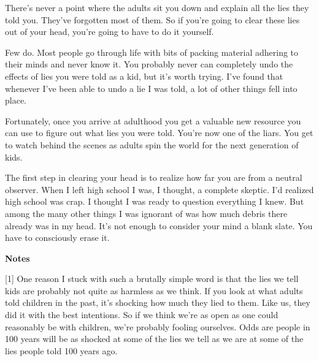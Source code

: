 There's never a point where the
                  adults sit you down and explain all the lies they told you.
                  They've forgotten most of them. So if you're going to clear
                  these lies out of your head, you're going to have to do it
                  yourself.

Few do. Most people go through life with
                  bits of packing material adhering to their minds and never
                  know it. You probably never can completely undo the effects of
                  lies you were told as a kid, but it's worth trying. I've found
                  that whenever I've been able to undo a lie I was told, a lot
                  of other things fell into place.

Fortunately, once
                  you arrive at adulthood you get a valuable new resource you
                  can use to figure out what lies you were told. You're now one
                  of the liars. You get to watch behind the scenes as adults
                  spin the world for the next generation of kids.

The
                  first step in clearing your head is to realize how far you are
                  from a neutral observer. When I left high school I was, I
                  thought, a complete skeptic. I'd realized high school was
                  crap. I thought I was ready to question everything I knew. But
                  among the many other things I was ignorant of was how much
                  debris there already was in my head. It's not enough to
                  consider your mind a blank slate. You have to consciously
                  erase it.






                  \textbf{Notes}

[1] One reason I stuck with such a brutally simple word is that
                  the lies we tell kids are probably not quite as harmless as we
                  think. If you look at what adults told children in the past,
                  it's shocking how much they lied to them. Like us, they did it
                  with the best intentions. So if we think we're as open as one
                  could reasonably be with children, we're probably fooling
                  ourselves. Odds are people in 100 years will be as shocked at
                  some of the lies we tell as we are at some of the lies people
                  told 100 years ago.

